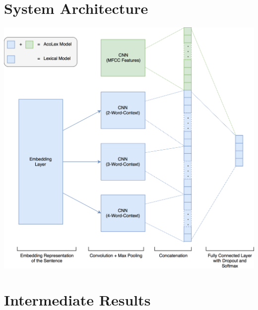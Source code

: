 \documentclass[a0,landscape]{a0poster}
\begin{document}
\begin{multicols}{3}

\section*{System Architecture}
\includegraphics[width=0.9\linewidth]{Bilder/CNN_Diagram.png}


\color{Black} %
\large

\section*{Intermediate Results}
\begin{center}
	\begin{tabular}{c | c |c | c | c | c | c | c }
		

\end{tabular}
\end{center}
\end{multicols}
\end{document}
